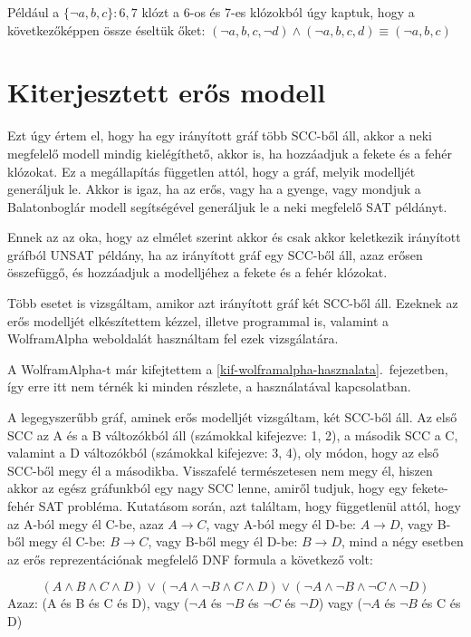 \documentclass[
]{thesis-ekf}
\theoremstyle{definition}
\theoremstyle{remark}
\begin{document}
	Például a $ \{\neg a,b,c\} :6,7 $ klózt a 6-os és 7-es klózokból úgy kaptuk, hogy a következőképpen össze éseltük őket:
	$ (\neg a,b,c,\neg d)\wedge(\neg a,b,c,d)\equiv(\neg a,b,c) $
	
	\section{Kiterjesztett erős modell}\label{kif-esm}
	Ezt úgy értem el, hogy ha egy irányított gráf több \textsc{SCC}-ből áll, akkor a neki megfelelő modell mindig kielégíthető, akkor is, ha hozzáadjuk a fekete és a fehér klózokat. Ez a megállapítás független attól, hogy a gráf, melyik modelljét generáljuk le. Akkor is igaz, ha az erős, vagy ha a gyenge, vagy mondjuk a Balatonboglár modell segítségével generáljuk le a neki megfelelő \textsc{SAT} példányt.
	
	Ennek az az oka, hogy az elmélet szerint akkor és csak akkor keletkezik irányított gráfból UNSAT példány, ha az irányított gráf egy \textsc{SCC}-ből áll, azaz erősen összefüggő, és hozzáadjuk a modelljéhez a fekete és a fehér klózokat.
	
	Több esetet is vizsgáltam, amikor azt irányított gráf két \textsc{SCC}-ből áll. Ezeknek az erős modelljét elkészítettem kézzel, illetve programmal is, valamint a WolframAlpha weboldalát használtam fel ezek vizsgálatára.
	
	A WolframAlpha-t már kifejtettem a \ref{kif-wolframalpha-hasznalata}.~fejezetben, így erre itt nem térnék ki minden részlete, a használatával kapcsolatban.
	 
	A legegyszerűbb gráf, aminek erős modelljét vizsgáltam, két \textsc{SCC}-ből áll. Az első \textsc{SCC} az A és a B változókból áll (számokkal kifejezve: 1, 2), a második \textsc{SCC} a C, valamint a D változókból (számokkal kifejezve: 3, 4), oly módon, hogy az első \textsc{SCC}-ből megy él a másodikba. Visszafelé természetesen nem megy él, hiszen akkor az egész gráfunkból egy nagy \textsc{SCC} lenne, amiről tudjuk, hogy egy fekete-fehér \textsc{SAT} probléma. Kutatásom során, azt találtam, hogy függetlenül attól, hogy az A-ból megy él C-be, azaz $ A \rightarrow C $, vagy A-ból megy él D-be: $A \rightarrow D$, vagy B-ből megy él C-be: $B\rightarrow C$, vagy B-ből megy él D-be: $B\rightarrow D$, mind a négy esetben az erős reprezentációnak megfelelő \textsc{DNF} formula a következő volt:
	
	\[ (A\wedge B\wedge C\wedge D)\vee (\neg A\wedge\neg B\wedge C\wedge D)\vee (\neg A\wedge\neg B\wedge\neg C\wedge\neg D) \]
	Azaz: (A és B és C és D), vagy ($ \neg A $ és $ \neg B $ és $ \neg C $ és $ \neg D $) vagy ($ \neg A $ és $ \neg B $ és C és D)
	
\end{document}
